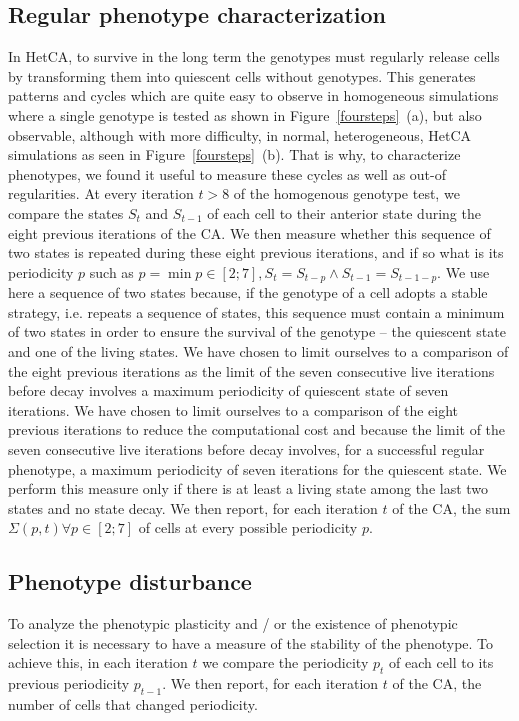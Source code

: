 \subsection{Regular phenotype characterization} 
In HetCA, to survive in the long term the genotypes must regularly release cells by transforming them into quiescent cells without genotypes. This generates patterns and cycles which are quite easy to observe in homogeneous simulations where a single genotype is tested as shown in Figure~\ref{foursteps}~(a), but also observable, although with more difficulty, in normal, heterogeneous, HetCA simulations as seen in Figure~\ref{foursteps}~(b). That is why, to characterize phenotypes, we found it useful to measure these cycles as well as out-of regularities. At every iteration $t>8$ of the homogenous genotype test, we compare the states $S_t$ and $S_{t-1}$ of each cell to their anterior state during the eight previous iterations of the CA. We then measure whether this sequence of two states is repeated during these eight previous iterations, and if so what is its periodicity $p$ such as $p=\min p \in [2;7], S_t=S_{t-p} \wedge S_{t-1}=S_{t-1-p}$. We use here a sequence of two states because, if the genotype of a cell adopts a stable strategy, i.e. repeats a sequence of states, this sequence must contain a minimum of two states in order to ensure the survival of the genotype -- the quiescent state and one of the living states. We have chosen to limit ourselves to a comparison of the eight previous iterations as the limit of the seven consecutive live iterations before decay involves a maximum periodicity of quiescent state of seven iterations. We have chosen to limit ourselves to a comparison of the eight previous iterations to reduce the computational cost and because the limit of the seven consecutive live iterations before decay involves, for a successful regular phenotype, a maximum periodicity of seven iterations for the quiescent state. We perform this measure only if there is at least a living state among the last two states and no state decay. We then report, for each iteration $t$ of the CA, the sum $\Sigma(p,t)\forall p \in [2;7]$ of cells at every possible periodicity $p$. 

\subsection{Phenotype disturbance} 
To analyze the phenotypic plasticity and / or the existence of phenotypic selection it is necessary to have a measure of the stability of the phenotype. To achieve this, in each iteration $t$ we compare the periodicity $p_t$ of each cell to its previous periodicity $p_{t-1}$. We then report, for each iteration $t$ of the CA, the number of cells that changed periodicity.
 
